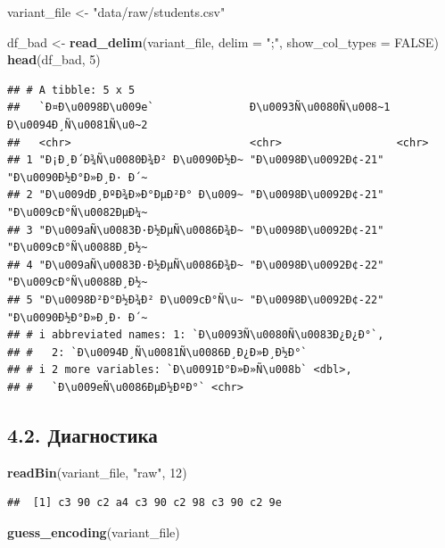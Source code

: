 \documentclass[
]{article}
\newenvironment{Shaded}{\begin{snugshade}}{\end{snugshade}}
\newcommand{\AttributeTok}[1]{\textcolor[rgb]{0.13,0.29,0.53}{#1}}
\newcommand{\ConstantTok}[1]{\textcolor[rgb]{0.56,0.35,0.01}{#1}}
\newcommand{\DecValTok}[1]{\textcolor[rgb]{0.00,0.00,0.81}{#1}}
\newcommand{\FunctionTok}[1]{\textcolor[rgb]{0.13,0.29,0.53}{\textbf{#1}}}
\newcommand{\NormalTok}[1]{#1}
\newcommand{\OtherTok}[1]{\textcolor[rgb]{0.56,0.35,0.01}{#1}}
\newcommand{\StringTok}[1]{\textcolor[rgb]{0.31,0.60,0.02}{#1}}
\begin{document}
\begin{Shaded}
\begin{Highlighting}[]
\NormalTok{variant\_file }\OtherTok{\textless{}{-}} \StringTok{"data/raw/students.csv"}

\NormalTok{df\_bad }\OtherTok{\textless{}{-}} \FunctionTok{read\_delim}\NormalTok{(variant\_file, }\AttributeTok{delim =} \StringTok{";"}\NormalTok{, }\AttributeTok{show\_col\_types =} \ConstantTok{FALSE}\NormalTok{)}
\FunctionTok{head}\NormalTok{(df\_bad, }\DecValTok{5}\NormalTok{)}
\end{Highlighting}
\end{Shaded}

\begin{verbatim}
## # A tibble: 5 x 5
##   `Ð¤Ð\u0098Ð\u009e`               Ð\u0093Ñ\u0080Ñ\u008~1 Ð\u0094Ð¸Ñ\u0081Ñ\u0~2
##   <chr>                            <chr>                  <chr>                 
## 1 "Ð¡Ð¸Ð´Ð¾Ñ\u0080Ð¾Ð² Ð\u0090Ð½Ð~ "Ð\u0098Ð\u0092Ð¢-21"  "Ð\u0090Ð½Ð°Ð»Ð¸Ð· Ð´~
## 2 "Ð\u009dÐ¸ÐºÐ¾Ð»Ð°ÐµÐ²Ð° Ð\u009~ "Ð\u0098Ð\u0092Ð¢-21"  "Ð\u009cÐ°Ñ\u0082ÐµÐ¼~
## 3 "Ð\u009aÑ\u0083Ð·Ð½ÐµÑ\u0086Ð¾Ð~ "Ð\u0098Ð\u0092Ð¢-21"  "Ð\u009cÐ°Ñ\u0088Ð¸Ð½~
## 4 "Ð\u009aÑ\u0083Ð·Ð½ÐµÑ\u0086Ð¾Ð~ "Ð\u0098Ð\u0092Ð¢-22"  "Ð\u009cÐ°Ñ\u0088Ð¸Ð½~
## 5 "Ð\u0098Ð²Ð°Ð½Ð¾Ð² Ð\u009cÐ°Ñ\u~ "Ð\u0098Ð\u0092Ð¢-22"  "Ð\u0090Ð½Ð°Ð»Ð¸Ð· Ð´~
## # i abbreviated names: 1: `Ð\u0093Ñ\u0080Ñ\u0083Ð¿Ð¿Ð°`,
## #   2: `Ð\u0094Ð¸Ñ\u0081Ñ\u0086Ð¸Ð¿Ð»Ð¸Ð½Ð°`
## # i 2 more variables: `Ð\u0091Ð°Ð»Ð»Ñ\u008b` <dbl>,
## #   `Ð\u009eÑ\u0086ÐµÐ½ÐºÐ°` <chr>
\end{verbatim}

\subsection{4.2.
Диагностика}\label{ux434ux438ux430ux433ux43dux43eux441ux442ux438ux43aux430}

\begin{Shaded}
\begin{Highlighting}[]
\FunctionTok{readBin}\NormalTok{(variant\_file, }\StringTok{"raw"}\NormalTok{, }\DecValTok{12}\NormalTok{)}
\end{Highlighting}
\end{Shaded}

\begin{verbatim}
##  [1] c3 90 c2 a4 c3 90 c2 98 c3 90 c2 9e
\end{verbatim}

\begin{Shaded}
\begin{Highlighting}[]
\FunctionTok{guess\_encoding}\NormalTok{(variant\_file)}
\end{Highlighting}
\end{Shaded}
\end{document}
